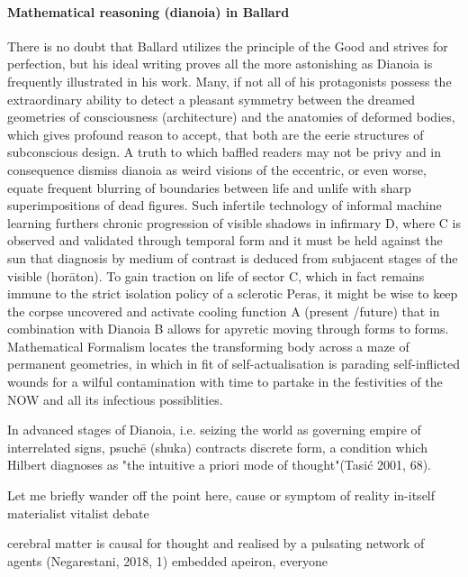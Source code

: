\documentclass{article}
\begin{document}
\paragraph{Mathematical reasoning (dianoia) in Ballard}
There is no doubt that Ballard 
utilizes the principle of the Good and strives for perfection, 
but his ideal writing proves all the more astonishing 
as Dianoia is frequently illustrated in his work. 
Many, if not all of his protagonists possess the extraordinary ability to 
detect a pleasant symmetry between the dreamed geometries of 
consciousness (architecture) and the anatomies of deformed bodies, which gives profound reason to accept, 
that both are the eerie structures of subconscious design. 
A truth to which baffled readers may not be privy 
and in consequence dismiss dianoia as weird visions of the eccentric, or even worse, 
equate frequent blurring of boundaries between life and unlife 
with sharp superimpositions of dead figures. 
Such infertile technology of informal machine learning furthers 
chronic progression of visible shadows in infirmary D, 
where C is observed and validated through temporal form and it 
must be held against the sun that diagnosis by medium of contrast is 
deduced from subjacent stages of the visible (hor\={a}ton). 
To gain traction on life of sector C, 
which in fact remains immune to the strict isolation policy of a sclerotic Peras, 
it might be wise to keep the corpse uncovered 
and activate cooling function A (present /future) 
that in combination with Dianoia B 
allows for apyretic moving through forms to forms. 
Mathematical Formalism locates the transforming body 
across a maze of permanent geometries, 
in which in fit of self-actualisation is parading self-inflicted wounds 
for a wilful contamination with time to partake in the festivities 
of the NOW and all its infectious possiblities.

In advanced stages of Dianoia, i.e. 
seizing the world as governing empire of interrelated signs, 
psuch\={e} (shuka) contracts discrete form, 
a condition which 
Hilbert diagnoses as
"the intuitive a priori mode of thought"(Tasi\'{c} 2001, 68).










Let me briefly wander off the point here, 
cause or symptom of reality in-itself 
materialist vitalist debate

cerebral matter is causal for thought  
and realised by a pulsating network of agents (Negarestani, 2018, 1)
embedded apeiron, everyone 
\end{document}
